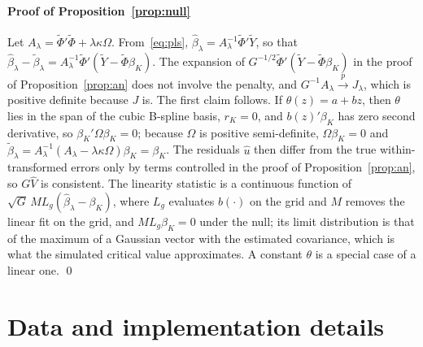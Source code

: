\documentclass[pdflatex,sn-basic]{sn-jnl}%
\theoremstyle{thmstyleone}
\theoremstyle{thmstyletwo}
\begin{document}
\begin{appendices}
\paragraph{Proof of Proposition~\ref{prop:null}}
Let $A_\lambda=\tilde\Phi'\tilde\Phi+\lambda\kappa\Omega$. From~\eqref{eq:pls}, $\hat\beta_\lambda=A_\lambda^{-1}\tilde\Phi'\tilde Y$, so that $\hat\beta_\lambda-\tilde\beta_\lambda=A_\lambda^{-1}\tilde\Phi'(\tilde Y-\tilde\Phi\beta_K)$. The expansion of $G^{-1/2}\tilde\Phi'(\tilde Y-\tilde\Phi\beta_K)$ in the proof of Proposition~\ref{prop:an} does not involve the penalty, and $G^{-1}A_\lambda\xrightarrow{p}J_\lambda$, which is positive definite because $J$ is. The first claim follows. If $\theta(z)=a+bz$, then $\theta$ lies in the span of the cubic B-spline basis, $r_K=0$, and $b(z)'\beta_K$ has zero second derivative, so $\beta_K'\Omega\beta_K=0$; because $\Omega$ is positive semi-definite, $\Omega\beta_K=0$ and $\tilde\beta_\lambda=A_\lambda^{-1}(A_\lambda-\lambda\kappa\Omega)\beta_K=\beta_K$. The residuals $\hat u$ then differ from the true within-transformed errors only by terms controlled in the proof of Proposition~\ref{prop:an}, so $G\hat V$ is consistent. The linearity statistic is a continuous function of $\sqrt G\,ML_g(\hat\beta_\lambda-\beta_K)$, where $L_g$ evaluates $b(\cdot)$ on the grid and $M$ removes the linear fit on the grid, and $ML_g\beta_K=0$ under the null; its limit distribution is that of the maximum of a Gaussian vector with the estimated covariance, which is what the simulated critical value approximates. A constant $\theta$ is a special case of a linear one. \qed

\section{Data and implementation details}\label{app:data}


\end{appendices}
\end{document}
